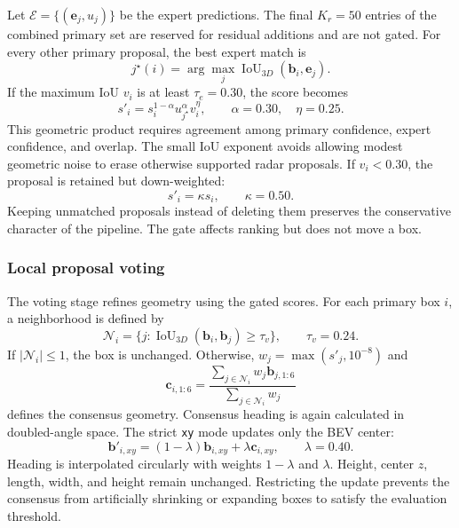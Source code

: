\documentclass[preprint,12pt,times]{elsarticle}
\begin{document}
Let $\mathcal{E}=\{(\mathbf{e}_j,u_j)\}$ be the expert predictions. The final
$K_r=50$ entries of the combined primary set are reserved for residual
additions and are not gated. For every other primary proposal, the best expert
match is
\begin{equation}
j^\star(i)=\arg\max_j
\operatorname{IoU}_{3D}(\mathbf{b}_i,\mathbf{e}_j).
\end{equation}
If the maximum IoU $v_i$ is at least $\tau_e=0.30$, the score becomes
\begin{equation}
s'_i=s_i^{1-\alpha}u_{j^\star}^{\alpha}v_i^\eta,
\qquad \alpha=0.30,\quad \eta=0.25.
\label{eq:quality-gate}
\end{equation}
This geometric product requires agreement among primary confidence, expert
confidence, and overlap. The small IoU exponent avoids allowing modest
geometric noise to erase otherwise supported radar proposals. If $v_i<0.30$,
the proposal is retained but down-weighted:
\begin{equation}
s'_i=\kappa s_i,\qquad \kappa=0.50.
\end{equation}
Keeping unmatched proposals instead of deleting them preserves the conservative
character of the pipeline. The gate affects ranking but does not move a box.

\subsubsection{Local proposal voting}

The voting stage refines geometry using the gated scores. For each primary box
$i$, a neighborhood is defined by
\begin{equation}
\mathcal{N}_i=\{j:
\operatorname{IoU}_{3D}(\mathbf{b}_i,\mathbf{b}_j)\geq\tau_v\},
\qquad \tau_v=0.24.
\end{equation}
If $\lvert\mathcal{N}_i\rvert\leq1$, the box is unchanged. Otherwise,
$w_j=\max(s'_j,10^{-8})$ and
\begin{equation}
\mathbf{c}_{i,1:6}=
\frac{\sum_{j\in\mathcal{N}_i}w_j\mathbf{b}_{j,1:6}}
{\sum_{j\in\mathcal{N}_i}w_j}
\end{equation}
defines the consensus geometry. Consensus heading is again calculated in
doubled-angle space. The strict \texttt{xy} mode updates only the BEV center:
\begin{equation}
\mathbf{b}'_{i,xy}=(1-\lambda)\mathbf{b}_{i,xy}
+\lambda\mathbf{c}_{i,xy},
\qquad \lambda=0.40.
\label{eq:voting}
\end{equation}
Heading is interpolated circularly with weights $1-\lambda$ and $\lambda$.
Height, center $z$, length, width, and height remain unchanged. Restricting the
update prevents the consensus from artificially shrinking or expanding boxes
to satisfy the evaluation threshold.
\end{document}
